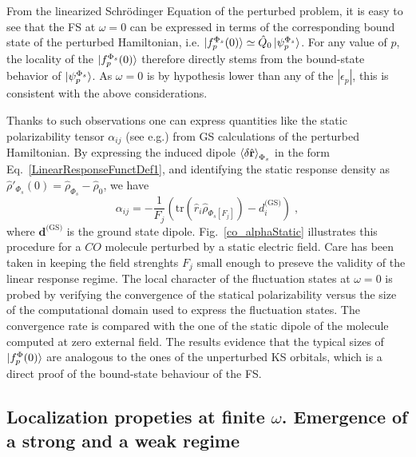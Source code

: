 \documentclass[reprint,aps,prb]{revtex4-1}
\newcommand{\eps}{\epsilon}
\newcommand{\be}{\begin{equation}}
\newcommand{\ee}{\end{equation}}
\newcommand{\op}[1]{\hat {#1}}
\newcommand{\trace}[1]{\mathrm{tr}\left(#1\right)}
\newcommand{\dmnot}{\op{\rho}_0}
\newcommand{\dm}{\op{\rho}}
\begin{document}
From the linearized Schr\"odinger Equation of the perturbed problem, it is easy to see that the FS at $\omega=0$ can be expressed
in terms of the corresponding bound state of the perturbed Hamiltonian, i.e.
$\ket{f_p^{\Phi_s}(0)} \simeq \op Q_0 \ket{\psi_p^{\Phi_s}}$.
For any value of $p$, the locality of the $\ket{f_p^{\Phi_s}(0)}$ therefore directly stems from the
bound-state behavior of $\ket{\psi_p^{\Phi_s}}$. As $\omega=0$ is by hypothesis
lower than any of the $|\eps_p|$, this is consistent with the above considerations.

Thanks to such observations one can express quantities like the static polarizability tensor $\alpha_{ij}$ (see e.g.\cite{DebElecField}) from GS calculations of the perturbed Hamiltonian.
By expressing the induced dipole $\braket{\delta \op{\mathbf r}}_{\Phi_s}$ in the form Eq.~\eqref{LinearResponseFunctDef1}, and identifying the static response density as $\dm'_{\Phi_s}(0) = \dm_{\Phi_s} -\dmnot $, we have
\be \label{staticalpha}
\alpha_{ij} =
-\frac{1}{F_j} \left(\trace{\op r_i \dm_{\Phi_s[F_j]}} - d^{\text{(GS)}}_i \right)\;,
\ee
where $\mathbf d^\text{(GS)}$ is the ground state dipole.
Fig.~\eqref{co_alphaStatic} illustrates this procedure for a $CO$ molecule
perturbed by a static electric field.
Care has been taken in keeping the field strenghts $F_j$ small enough to
preseve the validity of the linear response regime.
The local character of the fluctuation states at $\omega=0$ is
probed by verifying the convergence of the statical polarizability versus
the size of the computational domain used to express the fluctuation states. The convergence rate is compared with the
one of the static dipole of the molecule computed at zero external field.
The results evidence that the typical sizes of $\ket{f^\Phi_p(0)}$ are analogous to the ones of the unperturbed KS orbitals, which is a direct proof of the bound-state behaviour of the FS.


\subsection{Localization propeties at finite $\omega$. Emergence of a strong and a weak regime}

\end{document}
